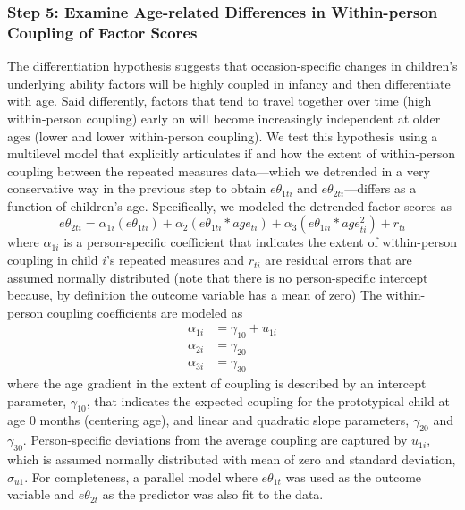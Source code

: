 \documentclass[man]{apa7}
\begin{document}
\hypertarget{step-5-examine-age-related-differences-in-within-person-coupling-of-factor-scores}{%
\subsubsection*{Step 5: Examine Age-related Differences in Within-person
Coupling of Factor
Scores}\label{step-5-examine-age-related-differences-in-within-person-coupling-of-factor-scores}}

The differentiation hypothesis suggests that occasion-specific changes
in children's underlying ability factors will be highly coupled in
infancy and then differentiate with age. Said differently, factors that
tend to travel together over time (high within-person coupling) early on
will become increasingly independent at older ages (lower and lower
within-person coupling). We test this hypothesis using a multilevel
model that explicitly articulates if and how the extent of within-person
coupling between the repeated measures data---which we detrended in a
very conservative way in the previous step to obtain \(e\theta_{1ti}\)
and \(e\theta_{2ti}\)---differs as a function of children's age.
Specifically, we modeled the detrended factor scores as \begin{equation}
e\theta_{2ti} = \alpha_{1i}(e\theta_{1ti}) + \alpha_{2}(e\theta_{1ti} * age_{ti}) + \alpha_{3}(e\theta_{1ti} * age^2_{ti}) + r_{ti}
\end{equation} where \(\alpha_{1i}\) is a person-specific coefficient
that indicates the extent of within-person coupling in child \(i\)'s
repeated measures and \(r_{ti}\) are residual errors that are assumed
normally distributed (note that there is no person-specific intercept
because, by definition the outcome variable has a mean of zero) The
within-person coupling coefficients are modeled as \begin{align}
\alpha_{1i} &= \gamma_{10} + u_{1i} \\
\alpha_{2i} &= \gamma_{20} \\ 
\alpha_{3i} &= \gamma_{30}
\end{align} where the age gradient in the extent of coupling is
described by an intercept parameter, \(\gamma_{10}\), that indicates the
expected coupling for the prototypical child at age 0 months (centering
age), and linear and quadratic slope parameters, \(\gamma_{20}\) and
\(\gamma_{30}\). Person-specific deviations from the average coupling
are captured by \(u_{1i}\), which is assumed normally distributed with
mean of zero and standard deviation, \(\sigma_{u1}\). For completeness,
a parallel model where \(e\theta_{1t}\) was used as the outcome variable
and \(e\theta_{2t}\) as the predictor was also fit to the data.
\end{document}
